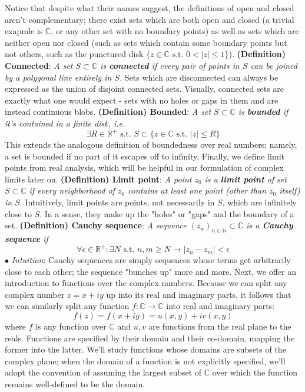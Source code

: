 \documentclass{article}
\newcommand*{\tb}{\textbf}
\newcommand*{\ti}{\textit}
\newcommand*{\n}{\newline}
\newcommand*{\nn}{\newline \newline}
\newcommand*{\In}{\indent \ensuremath{\bullet} \textit{Intuition}: }
\newcommand*{\N}{\mathbb{N}}
\newcommand*{\R}{\mathbb{R}}
\newcommand*{\C}{\mathbb{C}}
\newcommand*{\st}{\text{ s.t. }}
\begin{document}
\nn
Notice that despite what their names suggest, the definitions of open and closed aren't complementary; there exist sets which are both open and closed (a trivial exapmle is $ \C $, or any other set with no boundary points) as well as sets which are neither open nor closed (such as sets which contain some boundary points but not others, such as the punctured disk $ \{ z \in \C \st 0 < | z | \leq 1 \} $).
\nn
\tb{(Definition) Connected}: \ti{A set $ S \subset \C $ is \tb{connected} if every pair of points in $ S $ can be joined by a polygonal line entirely in $ S $.}
\nn
Sets which are disconnected can always be expressed as the union of disjoint connected sets. Visually, connected sets are exactly what one would expect - sets with no holes or gaps in them and are instead continuous blobs.
\nn
\tb{(Definition) Bounded}: \ti{A set $ S \subset \C $ is \tb{bounded} if it's contained in a finite disk, i.e.}
$$ \exists R \in \R^+ \st S \subset \{ z \in \C \st | z | \leq R \} $$
This extends the analogous definition of boundedness over real numbers; namely, a set is bounded if no part of it escapes off to infinity. Finally, we define limit points from real analysis, which will be helpful in our formulation of complex limits later on.
\nn
\tb{(Definition) Limit point}: \ti{A point $ z_0 $ is a \tb{limit point} of set $ S \subset \C $ if every neighborhood of $ z_0 $ contains at least one point (other than $ z_0 $ itself) in $ S $}.
\nn
Intuitively, limit points are points, not necessarily in $ S $, which are infinitely close to $ S $. In a sense, they make up the "holes" or "gaps" and the boundary of a set.
\nn
\tb{(Definition) Cauchy sequence}: \ti{A sequence $ ( z_n )_{n \in \N} \subset \C $ is a \tb{Cauchy sequence} if}
$$ \forall \epsilon \in \R^+: \exists N \st n, m \geq N \rightarrow | z_n - z_m | < \epsilon $$
\n
\In Cauchy sequences are simply sequences whose terms get arbitrarily close to each other; the sequence "bunches up" more and more.
\nn
Next, we offer an introduction to functions over the complex numbers. Because we can split any complex number $ z = x + i y $ up into its real and imaginary parts, it follows that we can similarly split any function $ f: \C \rightarrow \C $ into real and imaginary parts:
$$ f(z) = f(x + i y) = u(x, y) + i v(x, y) $$
where $ f $ is any function over $ \C $ and $ u, v $ are functions from the real plane to the reals. Functions are specified by their domain and their co-domain, mapping the former into the latter. We'll study functions whose domains are subsets of the complex plane; when the domain of a function is not explicitly specified, we'll adopt the convention of assuming the largest subset of $ \C $ over which the function remains well-defined to be the domain.
\end{document}
